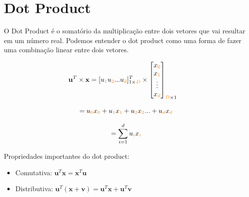 \section{Dot Product}
O Dot Product é o somatório da multiplicação entre dois vetores que vai resultar em um número real. Podemos entender o dot product como uma forma de fazer uma combinação linear entre dois vetores.

\vspace{0.5cm}

\begin{equation}
\begin{aligned}
    \mathbf{u}^T \times \mathbf{x} = [u_{\mathcolor{orange}{1}} u_{\mathcolor{orange}{2}} ... u_{\mathcolor{orange}{d}}]^T_{1 \times\mathcolor{orange}{D} }\times 
    \begin{bmatrix}
    x_{\mathcolor{orange}{0}} \\
    x_{\mathcolor{orange}{1}} \\
    \vdots \\
    x_{\mathcolor{orange}{d}}
\end{bmatrix}_{\mathcolor{orange}{D}\times 1} \quad \\
\end{aligned}
\end{equation}

\begin{equation*}
    = u_{\mathcolor{orange}{0}}x_{\mathcolor{orange}{0}} + u_{\mathcolor{orange}{1}}x_{\mathcolor{orange}{1}} + u_{\mathcolor{orange}{2}}x_{\mathcolor{orange}{2}} ... +u_{\mathcolor{orange}{d}}x_{\mathcolor{orange}{d}}
\end{equation*}

\begin{equation*}
= \sum_{i=1}^{d} u_{\mathcolor{orange}{i}}x_{\mathcolor{orange}{i}}
\end{equation*}

\vspace{0.5cm}

Propriedades importantes do dot product:
\begin{itemize}
    \item Comutativa: $\mathbf{u}^T \mathbf{x} = \mathbf{x}^T \mathbf{u}$
    \item Distributiva: $\mathbf{u}^T (\mathbf{x} + \mathbf{v}) = \mathbf{u}^T \mathbf{x} + \mathbf{u}^T \mathbf{v}$
\end{itemize}

\vspace{0.5cm}


